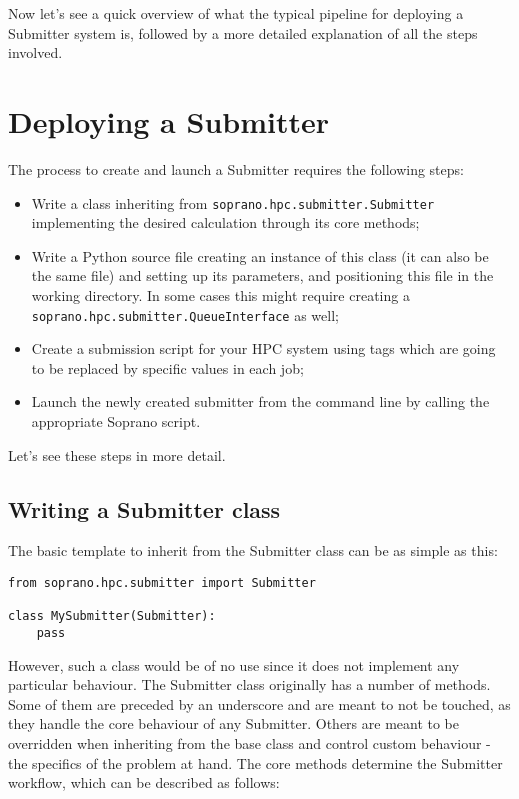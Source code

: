 \documentclass[]{report}
\begin{document}
Now let's see a quick overview of what the typical pipeline for deploying a Submitter system is, followed by a more detailed explanation of all the steps involved.

\chapter{Deploying a Submitter}

The process to create and launch a Submitter requires the following steps:

\begin{itemize}
	\item Write a class inheriting from \lstinline|soprano.hpc.submitter.Submitter| implementing the desired calculation through its core methods;
	\item Write a Python source file creating an instance of this class (it can also be the same file) and setting up its parameters, and positioning this file in the working directory. In some cases this might require creating a \lstinline|soprano.hpc.submitter.QueueInterface| as well;
	\item Create a submission script for your HPC system using tags which are going to be replaced by specific values in each job;
	\item Launch the newly created submitter from the command line by calling the appropriate Soprano script.
\end{itemize}

Let's see these steps in more detail.

\section{Writing a Submitter class}

The basic template to inherit from the Submitter class can be as simple as this:

\begin{lstlisting}
from soprano.hpc.submitter import Submitter

class MySubmitter(Submitter):
	pass
\end{lstlisting}

However, such a class would be of no use since it does not implement any particular behaviour. The Submitter class originally has a number of methods. Some of them are preceded by an underscore and are meant to not be touched, as they handle the core behaviour of any Submitter. Others are meant to be overridden when inheriting from the base class and control custom behaviour - the specifics of the problem at hand. The core methods determine the Submitter workflow, which can be described as follows:
\end{document}
